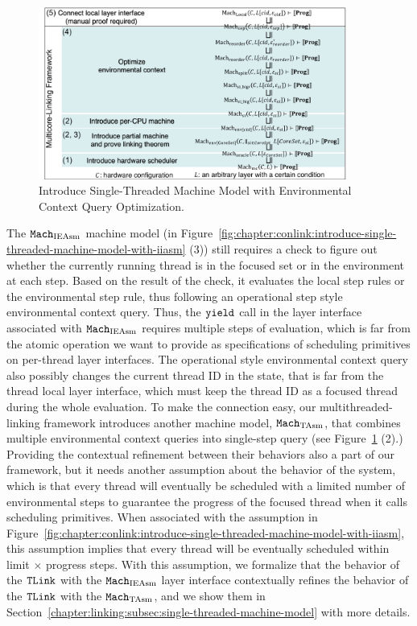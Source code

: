 \begin{figure}
\begin{center}
\includegraphics[width=0.9\textwidth, page=8]{figs/conlink/concurrent_linking}
\end{center}
\caption{Introduce Single-Threaded Machine Model with Environmental Context Query Optimization.}
\label{fig:chapter:conlink:introduce-single-threaded-machine-model-with-tasm}
\end{figure}

The ${\mathrm{\texttt{Mach}}}_{\mathrm{IEAsm}}$ machine model  (in Figure~\ref{fig:chapter:conlink:introduce-single-threaded-machine-model-with-iiasm}  (3)) still requires a check to figure out whether the currently running thread is in the focused set or in the environment at each step.
Based on the result of the check, it evaluates the local step rules or the environmental step rule, thus following an operational step style environmental context query.
Thus, the ${\mathrm{\texttt{yield}}}$ call in the layer interface associated with ${\mathrm{\texttt{Mach}}}_{\mathrm{IEAsm}}$ requires multiple steps of evaluation, which is 
far from the atomic operation  we want to provide as specifications of scheduling primitives on per-thread layer interfaces.
The operational style environmental context query also possibly changes 
the current thread ID in the state, that is far from the thread local layer interface, which must keep the thread ID as a focused thread during the whole evaluation.
To make the connection easy,
our multithreaded-linking framework introduces  another machine model, ${\mathrm{\texttt{Mach}}}_{\mathrm{TAsm}}$, 
that combines multiple environmental context queries into  single-step query (see Figure~\ref{fig:chapter:conlink:introduce-single-threaded-machine-model-with-tasm} (2).)
Providing the contextual refinement between their behaviors  also a part of
our framework, but it needs 
another assumption about the behavior of the system,
which is that every thread will  eventually be scheduled with a limited number of 
environmental steps to guarantee the progress of the focused thread when it calls scheduling primitives. 
When associated with the assumption in Figure~\ref{fig:chapter:conlink:introduce-single-threaded-machine-model-with-iiasm},
this assumption implies that every thread will be eventually scheduled within limit $\times$ progress steps.
With this assumption, 
we formalize 
that the behavior of  the ${{\mathrm{\texttt{TLink}}}}$ with the ${\mathrm{\texttt{Mach}}}_{\mathrm{IEAsm}}$ layer interface  contextually refines
the behavior of  the ${{\mathrm{\texttt{TLink}}}}$ with the ${\mathrm{\texttt{Mach}}}_{\mathrm{TAsm}}$, and 
we show them in Section~\ref{chapter:linking:subsec:single-threaded-machine-model} with more details.


